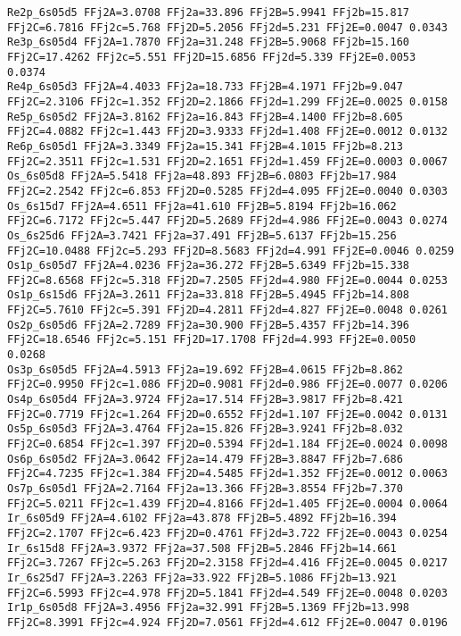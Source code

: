 {\begin{verbatim}
Re2p_6s05d5 FFj2A=3.0708 FFj2a=33.896 FFj2B=5.9941 FFj2b=15.817 FFj2C=6.7816 FFj2c=5.768 FFj2D=5.2056 FFj2d=5.231 FFj2E=0.0047 0.0343 
Re3p_6s05d4 FFj2A=1.7870 FFj2a=31.248 FFj2B=5.9068 FFj2b=15.160 FFj2C=17.4262 FFj2c=5.551 FFj2D=15.6856 FFj2d=5.339 FFj2E=0.0053 0.0374 
Re4p_6s05d3 FFj2A=4.4033 FFj2a=18.733 FFj2B=4.1971 FFj2b=9.047 FFj2C=2.3106 FFj2c=1.352 FFj2D=2.1866 FFj2d=1.299 FFj2E=0.0025 0.0158 
Re5p_6s05d2 FFj2A=3.8162 FFj2a=16.843 FFj2B=4.1400 FFj2b=8.605 FFj2C=4.0882 FFj2c=1.443 FFj2D=3.9333 FFj2d=1.408 FFj2E=0.0012 0.0132 
Re6p_6s05d1 FFj2A=3.3349 FFj2a=15.341 FFj2B=4.1015 FFj2b=8.213 FFj2C=2.3511 FFj2c=1.531 FFj2D=2.1651 FFj2d=1.459 FFj2E=0.0003 0.0067 
Os_6s05d8 FFj2A=5.5418 FFj2a=48.893 FFj2B=6.0803 FFj2b=17.984 FFj2C=2.2542 FFj2c=6.853 FFj2D=0.5285 FFj2d=4.095 FFj2E=0.0040 0.0303 
Os_6s15d7 FFj2A=4.6511 FFj2a=41.610 FFj2B=5.8194 FFj2b=16.062 FFj2C=6.7172 FFj2c=5.447 FFj2D=5.2689 FFj2d=4.986 FFj2E=0.0043 0.0274 
Os_6s25d6 FFj2A=3.7421 FFj2a=37.491 FFj2B=5.6137 FFj2b=15.256 FFj2C=10.0488 FFj2c=5.293 FFj2D=8.5683 FFj2d=4.991 FFj2E=0.0046 0.0259 
Os1p_6s05d7 FFj2A=4.0236 FFj2a=36.272 FFj2B=5.6349 FFj2b=15.338 FFj2C=8.6568 FFj2c=5.318 FFj2D=7.2505 FFj2d=4.980 FFj2E=0.0044 0.0253 
Os1p_6s15d6 FFj2A=3.2611 FFj2a=33.818 FFj2B=5.4945 FFj2b=14.808 FFj2C=5.7610 FFj2c=5.391 FFj2D=4.2811 FFj2d=4.827 FFj2E=0.0048 0.0261 
Os2p_6s05d6 FFj2A=2.7289 FFj2a=30.900 FFj2B=5.4357 FFj2b=14.396 FFj2C=18.6546 FFj2c=5.151 FFj2D=17.1708 FFj2d=4.993 FFj2E=0.0050 0.0268 
Os3p_6s05d5 FFj2A=4.5913 FFj2a=19.692 FFj2B=4.0615 FFj2b=8.862 FFj2C=0.9950 FFj2c=1.086 FFj2D=0.9081 FFj2d=0.986 FFj2E=0.0077 0.0206 
Os4p_6s05d4 FFj2A=3.9724 FFj2a=17.514 FFj2B=3.9817 FFj2b=8.421 FFj2C=0.7719 FFj2c=1.264 FFj2D=0.6552 FFj2d=1.107 FFj2E=0.0042 0.0131 
Os5p_6s05d3 FFj2A=3.4764 FFj2a=15.826 FFj2B=3.9241 FFj2b=8.032 FFj2C=0.6854 FFj2c=1.397 FFj2D=0.5394 FFj2d=1.184 FFj2E=0.0024 0.0098 
Os6p_6s05d2 FFj2A=3.0642 FFj2a=14.479 FFj2B=3.8847 FFj2b=7.686 FFj2C=4.7235 FFj2c=1.384 FFj2D=4.5485 FFj2d=1.352 FFj2E=0.0012 0.0063 
Os7p_6s05d1 FFj2A=2.7164 FFj2a=13.366 FFj2B=3.8554 FFj2b=7.370 FFj2C=5.0211 FFj2c=1.439 FFj2D=4.8166 FFj2d=1.405 FFj2E=0.0004 0.0064 
Ir_6s05d9 FFj2A=4.6102 FFj2a=43.878 FFj2B=5.4892 FFj2b=16.394 FFj2C=2.1707 FFj2c=6.423 FFj2D=0.4761 FFj2d=3.722 FFj2E=0.0043 0.0254 
Ir_6s15d8 FFj2A=3.9372 FFj2a=37.508 FFj2B=5.2846 FFj2b=14.661 FFj2C=3.7267 FFj2c=5.263 FFj2D=2.3158 FFj2d=4.416 FFj2E=0.0045 0.0217 
Ir_6s25d7 FFj2A=3.2263 FFj2a=33.922 FFj2B=5.1086 FFj2b=13.921 FFj2C=6.5993 FFj2c=4.978 FFj2D=5.1841 FFj2d=4.549 FFj2E=0.0048 0.0203 
Ir1p_6s05d8 FFj2A=3.4956 FFj2a=32.991 FFj2B=5.1369 FFj2b=13.998 FFj2C=8.3991 FFj2c=4.924 FFj2D=7.0561 FFj2d=4.612 FFj2E=0.0047 0.0196 

\end{verbatim}}
